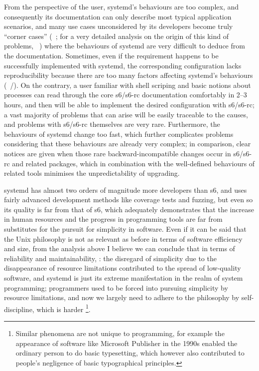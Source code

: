 From the perspective of the user, systemd's behaviours are too complex, and
consequently its documentation can only describe most typical application
scenarios, and many use cases unconsidered by its developers become truly
``corner cases'' (\eg~\parencite{dbiii2016}; for a very detailed analysis
on the origin of this kind of problems, \cf~\parencite{vr2015}) where the
behaviours of systemd are very difficult to deduce from the documentation.
Sometimes, even if the requirement happens to be successfully implemented
with systemd, the corresponding configuration lacks reproducibility because
there are too many factors affecting systemd's behaviours (\eg~\parencite%
{fitzcarraldo2018}/\parencite{magsforumtechno.2019}).  On the contrary, a user
familiar with shell scriping and basic notions about processes can read through
the core s6/s6-rc documentation comfortably in 2--3 hours, and then will be able
to implement the desired configuration with s6/s6-rc; a vast majority of
problems that can arise will be easily traceable to the causes, and problems
with s6/s6-rc themselves are very rare.  Furthermore,
the behaviours of systemd change too fast, which
further complicates problems considering that these behaviours are already
very complex; in comparison, clear notices are given when those rare
backward-incompatible changes occur in s6/s6-rc and related packages,
which in combination with the well-defined behaviours of related
tools minimises the unpredictability of upgrading.

systemd has almost two orders of magnitude more developers than s6, and uses
fairly advanced development methods like coverage tests and fuzzing, but even so
its quality is far from that of s6, which adequately demonstrates that the
increase in human resources and the progress in programming tools are far from
substitutes for the pursuit for simplicity in software.  Even if it can be said
that the Unix philosophy is not as relevant as before in terms of software
efficiency and size, from the analysis above I believe we can conclude that in
terms of reliability and maintainability, : the disregard of
simplicity due to the disappearance of resource limitations contributed to the
spread of low-quality software, and systemd is just its extreme manifestation
in the realm of system programming; programmers used
to be forced into pursuing simplicity by resource limitations, and now we
largely need to adhere to the philosophy by self-discipline, which is harder%
\footnote{Similar phenomena are not unique to programming, for example
the appearance of software like Microsoft Publisher in the 1990s enabled
the ordinary person to do basic typesetting,
which however also contributed to people's negligence of
basic typographical principles.}.

